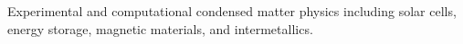Experimental and computational condensed matter physics including solar cells, energy storage, magnetic materials, and intermetallics. 
